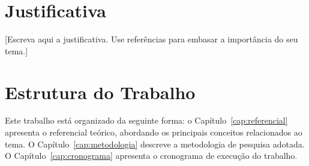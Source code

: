 
\section{Justificativa}

%

[Escreva aqui a justificativa. Use referências para embasar a importância do seu tema.]



\section{Estrutura do Trabalho}


Este trabalho está organizado da seguinte forma: o Capítulo~\ref{cap:referencial} apresenta o referencial teórico, abordando os principais conceitos relacionados ao tema. O Capítulo~\ref{cap:metodologia} descreve a metodologia de pesquisa adotada. O Capítulo~\ref{cap:cronograma} apresenta o cronograma de execução do trabalho.
